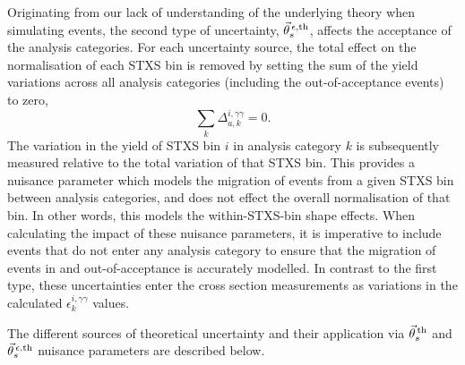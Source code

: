Originating from our lack of understanding of the underlying theory when simulating events, the second type of uncertainty, $\vec{\theta}^{\,\epsilon,{\rm{th}}}_{s}$, affects the acceptance of the analysis categories. For each uncertainty source, the total effect on the normalisation of each STXS bin is removed by setting the sum of the yield variations across all analysis categories (including the out-of-acceptance events) to zero,
\begin{equation}
    \sum_k \Delta^{i,\gamma\gamma}_{a,k} = 0.
\end{equation}
\noindent
The variation in the yield of STXS bin $i$ in analysis category $k$ is subsequently measured relative to the total variation of that STXS bin. This provides a nuisance parameter which models the migration of events from a given STXS bin between analysis categories, and does not effect the overall normalisation of that bin. In other words, this models the within-STXS-bin shape effects. When calculating the impact of these nuisance parameters, it is imperative to include events that do not enter any analysis category to ensure that the migration of events in and out-of-acceptance is accurately modelled. In contrast to the first type, these uncertainties enter the cross section measurements as variations in the calculated $\epsilon^{i,\gamma\gamma}_{k}$ values.

The different sources of theoretical uncertainty and their application via $\vec{\theta}^{\,\rm{th}}_{s}$ and $\vec{\theta}^{\,\epsilon,{\rm{th}}}_{s}$ nuisance parameters are described below.

